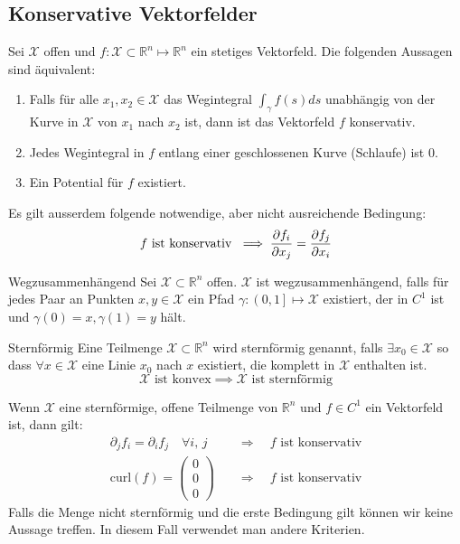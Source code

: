 \documentclass[a4paper,10pt]{article}
\def\R{\mathbb{R}}
\def\X{\mathcal{X}}
\begin{document}
\subsection{Konservative Vektorfelder}
Sei \(\X\) offen und \(f: \X \subset \R^n \mapsto \R^n\) ein stetiges Vektorfeld. Die folgenden Aussagen sind äquivalent:
\begin{enumerate}
  \item Falls für alle \(x_1, x_2 \in \X\) das Wegintegral \(\int_\gamma f(s) ds\) unabhängig von der Kurve in \(\X\) von \(x_1\) nach \(x_2\) ist, dann ist das Vektorfeld \(f\) konservativ.
  \item Jedes Wegintegral in \(f\) entlang einer geschlossenen Kurve (Schlaufe) ist 0.
  \item Ein Potential für \(f\) existiert.
\end{enumerate}
Es gilt ausserdem folgende notwendige, aber nicht ausreichende Bedingung:
\[f \text{ ist konservativ }\implies \pdv{f_i}{x_j} = \pdv{f_j}{x_i}\]

\begin{subbox}{Wegzusammenhängend}
  Sei \(\X \subset \R^n\) offen. \(\X\) ist wegzusammenhängend, falls für jedes Paar an Punkten \(x, y \in \X\) ein Pfad \(\gamma : \left(0,1\right] \mapsto \X\) existiert, der in \(C^1\) ist und \(\gamma(0) = x, \gamma(1) = y\) hält.
\end{subbox}

\begin{subbox}{Sternförmig}
  Eine Teilmenge \(\X \subset \R^n\) wird sternförmig genannt, falls \(\exists x_0 \in \X\) so dass \(\forall x \in \X\) eine Linie \(x_0\) nach \(x\) existiert, die komplett in \(\X\) enthalten ist. 
  \[\X \text{ ist konvex} \implies \X \text{ ist sternförmig}\]
\end{subbox}
Wenn \(\X\) eine sternförmige, offene Teilmenge von \(\R^n\) und \(f \in C^1\) ein Vektorfeld ist, dann gilt:
\begin{align*}
  \partial_j f_i = \partial_i f_j \quad \forall i,\, j
  \quad &\Rightarrow \quad \text{$f$ ist konservativ}\\
  \text{curl}(f) = \begin{pmatrix}
    0\\0\\0
  \end{pmatrix}
  \quad &\Rightarrow \quad \text{$f$ ist konservativ}
\end{align*}
Falls die Menge nicht sternförmig und die erste Bedingung gilt können wir keine Aussage treffen. In diesem Fall verwendet man andere Kriterien.
\end{document}
